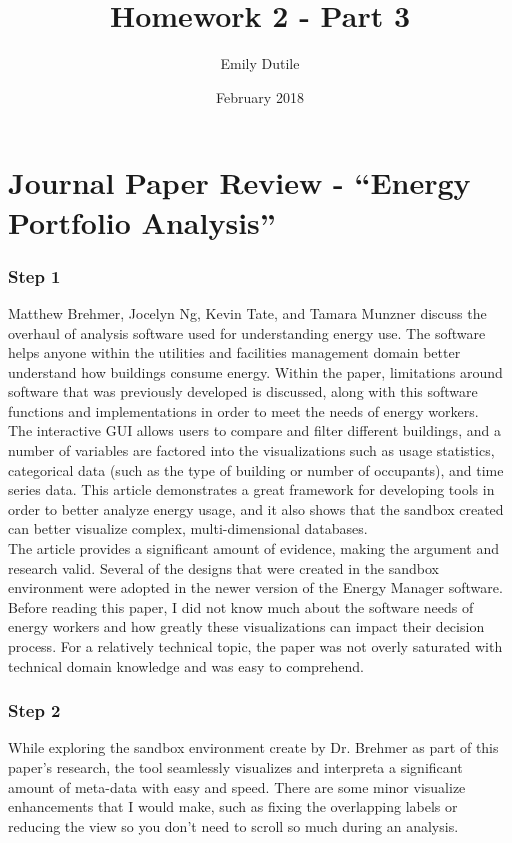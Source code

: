 \documentclass{neu_handout}
\title{Homework 2 - Part 3}
\author{Emily Dutile}
\date{February 2018}
\begin{document}
\section*{Journal Paper Review - “Energy Portfolio Analysis”}

\subsubsection*{Step 1}
Matthew Brehmer, Jocelyn Ng, Kevin Tate, and Tamara Munzner discuss the overhaul of analysis software used for understanding energy use. The software helps anyone within the utilities and facilities management domain better understand how buildings consume energy. Within the paper, limitations around software that was previously developed is discussed, along with this software functions and implementations in order to meet the needs of energy workers.\\

The interactive GUI allows users to compare and filter different buildings, and a number of variables are factored into the visualizations such as usage statistics, categorical data (such as the type of building or number of occupants), and time series data. This article demonstrates a great framework for developing tools in order to better analyze energy usage, and it also shows that the sandbox created can better visualize complex, multi-dimensional databases.\\

The article provides a significant amount of evidence, making the argument and research valid. Several of the designs that were created in the sandbox environment were adopted in the newer version of the Energy Manager software. Before reading this paper, I did not know much about the software needs of energy workers and how greatly these visualizations can impact their decision process. For a relatively technical topic, the paper was not overly saturated with technical domain knowledge and was easy to comprehend. \\



\subsubsection*{Step 2}
While exploring the sandbox environment create by Dr. Brehmer as part of this paper’s
research, the tool seamlessly visualizes and interpreta a significant amount of meta-data with easy and speed. There are some minor visualize enhancements that I would make, such as fixing the overlapping labels or reducing the view so you don't need to scroll so much during an analysis.
\end{document}
